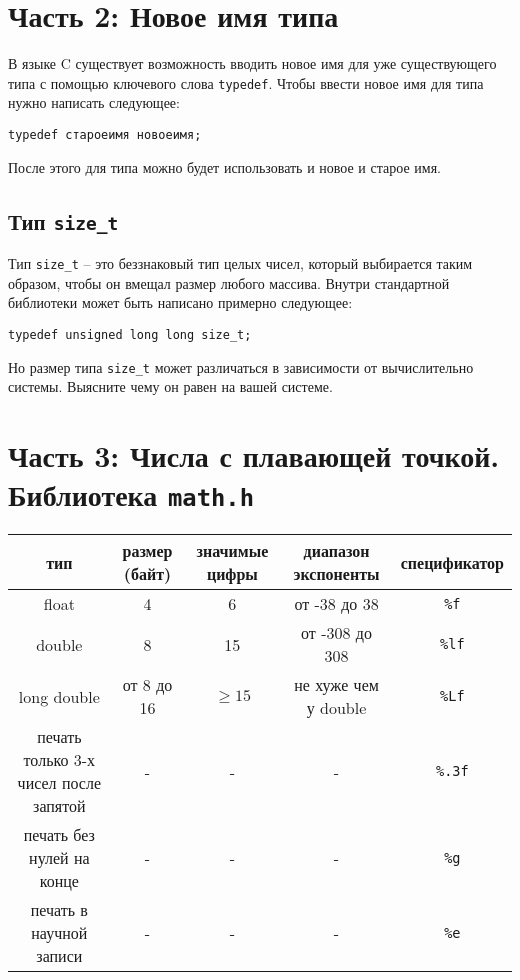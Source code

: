 \documentclass{article}
\begin{document}
\section*{Часть 2: Новое имя типа}
В языке C существует возможность вводить новое имя для уже существующего типа с помощью ключевого слова \texttt{typedef}. Чтобы ввести новое имя для типа нужно написать следующее:
\begin{lstlisting}
typedef староеимя новоеимя;
\end{lstlisting}
После этого для типа можно будет использовать и новое и старое имя.


\subsection*{Тип \texttt{size\_t}} 
Тип \texttt{size\_t} -- это беззнаковый тип целых чисел, который выбирается таким образом, чтобы он вмещал размер любого массива. Внутри стандартной библиотеки может быть написано примерно следующее:
\begin{lstlisting}
typedef unsigned long long size_t;
\end{lstlisting}
Но размер типа \texttt{size\_t} может различаться в зависимости от вычислительно системы. Выясните чему он равен на вашей системе.

\newpage
\section*{Часть 3: Числа с плавающей точкой. Библиотека \texttt{math.h}}
\begin{center}
\begin{tabular}{ c c c c c }
 тип & размер (байт) & значимые цифры & диапазон экспоненты & спецификатор \\ \hline
 float             & 4          & 6  & от -38 до 38    & \texttt{\%f} \\ 
 double            & 8          & 15 & от -308 до 308  & \texttt{\%lf}  \\  
 long double       & от 8 до 16 & $\ge 15$  & не хуже чем у double  & \texttt{\%Lf}  \\ \hline
 печать только 3-х чисел после запятой & -          & -  & -              & \texttt{\%.3f} \\
 печать без нулей на конце & -          & -  & -              & \texttt{\%g} \\
 печать в научной записи   & -          & -  & -              & \texttt{\%e} \\
\end{tabular}
\end{center}
\end{document}
